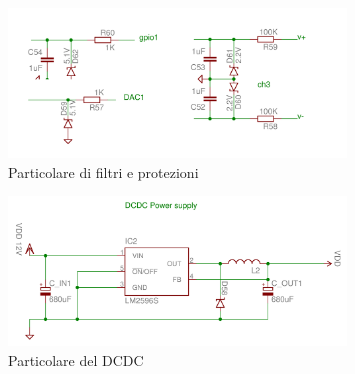 \documentclass[10pt]{article}
\begin{document}
	\begin{figure}[h]
	\centering
	\includegraphics[width=0.8\textwidth]{src/filters_schematic}
	\caption{Particolare di filtri e protezioni}\label{fig:filters}
	\end{figure}

	\begin{figure}[h]
	\centering
	\includegraphics[width=0.8\textwidth]{src/dcdc_schematic}
	\caption{Particolare del DCDC}\label{fig:dcdc}
	\end{figure}
\end{document}
